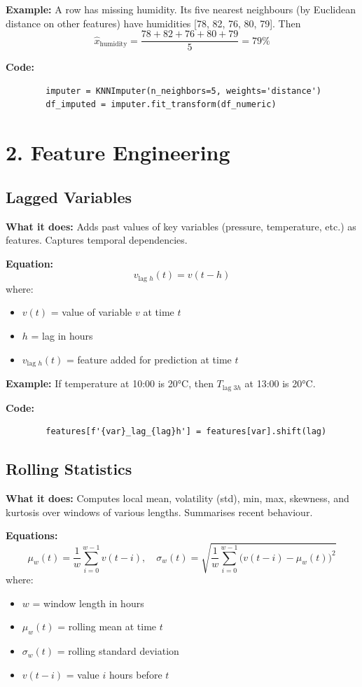 \documentclass[12pt]{article}
\begin{document}
	\textbf{Example:} A row has missing humidity. Its five nearest neighbours (by Euclidean distance on other features) have humidities [78, 82, 76, 80, 79]. Then
	\[
	\hat{x}_{\text{humidity}} = \frac{78+82+76+80+79}{5} = 79\%
	\]
	
	\textbf{Code:}
	\begin{lstlisting}
		imputer = KNNImputer(n_neighbors=5, weights='distance')
		df_imputed = imputer.fit_transform(df_numeric)
	\end{lstlisting}
	
	\section*{2. Feature Engineering}
	
	\subsection*{Lagged Variables}
	\textbf{What it does:} Adds past values of key variables (pressure, temperature, etc.) as features. Captures temporal dependencies.
	
	\textbf{Equation:}
	\[
	v_{\text{lag }h}(t) = v(t-h)
	\]
	where:
	\begin{itemize}
		\item $v(t)$ = value of variable $v$ at time $t$
		\item $h$ = lag in hours
		\item $v_{\text{lag }h}(t)$ = feature added for prediction at time $t$
	\end{itemize}
	
	\textbf{Example:} If temperature at 10:00 is 20°C, then $T_{\text{lag }3h}$ at 13:00 is 20°C.
	
	\textbf{Code:}
	\begin{lstlisting}
		features[f'{var}_lag_{lag}h'] = features[var].shift(lag)
	\end{lstlisting}
	
	\subsection*{Rolling Statistics}
	\textbf{What it does:} Computes local mean, volatility (std), min, max, skewness, and kurtosis over windows of various lengths. Summarises recent behaviour.
	
	\textbf{Equations:}
	\[
	\mu_w(t) = \frac{1}{w}\sum_{i=0}^{w-1} v(t-i),\quad
	\sigma_w(t) = \sqrt{\frac{1}{w}\sum_{i=0}^{w-1} \bigl(v(t-i)-\mu_w(t)\bigr)^2}
	\]
	where:
	\begin{itemize}
		\item $w$ = window length in hours
		\item $\mu_w(t)$ = rolling mean at time $t$
		\item $\sigma_w(t)$ = rolling standard deviation
		\item $v(t-i)$ = value $i$ hours before $t$
	\end{itemize}
	
\end{document}

